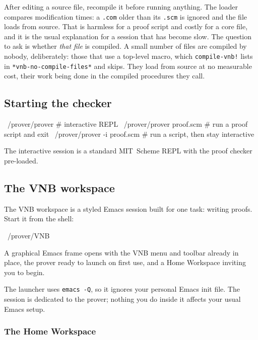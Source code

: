 After editing a source file, recompile it before running anything.  The
loader compares modification times: a \texttt{.com} older than its
\texttt{.scm} is ignored and the file loads from source.  That is harmless
for a proof script and costly for a core file, and it is the usual
explanation for a session that has become slow.  The question to ask is
whether \emph{that file} is compiled.  A small number of files are compiled
by nobody, deliberately: those that use a top-level macro, which
\texttt{compile-vnb!} lists in \texttt{*vnb-no-compile-files*} and skips.  They
load from source at no measurable cost, their work being done in the compiled
procedures they call.

\subsection{Starting the checker}

\begin{VNBsnip}
~/prover/prover              # interactive REPL
~/prover/prover proof.scm    # run a proof script and exit
~/prover/prover -i proof.scm # run a script, then stay interactive
\end{VNBsnip}

The interactive session is a standard MIT~Scheme REPL with the proof
checker pre-loaded.
\subsection{The VNB workspace}
\label{sec:emacs}

The VNB workspace is a styled Emacs session built for one task:
writing proofs.  Start it from the shell:

\begin{VNBsnip}
~/prover/VNB
\end{VNBsnip}

\noindent
A graphical Emacs frame opens with the VNB menu and toolbar already
in place, the prover ready to launch on first use, and a Home
Workspace inviting you to begin.

\begin{remark}
The launcher uses \texttt{emacs -Q}, so it ignores your personal
Emacs init file.  The session is dedicated to the prover; nothing
you do inside it affects your usual Emacs setup.
\end{remark}

\subsubsection{The Home Workspace}

